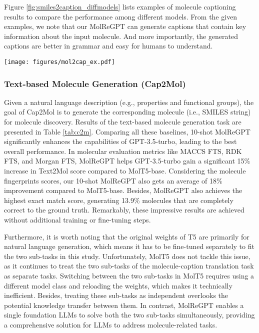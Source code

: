 \documentclass{article}
\theoremstyle{plain}
\theoremstyle{definition}
\theoremstyle{remark}
\begin{document}
Figure \ref{fig:smiles2caption_diffmodels} lists examples of molecule captioning results to compare the performance among different models. From the given examples, we note that our MolReGPT can generate captions that contain key information about the input molecule. And more importantly, the generated captions are better in grammar and easy for humans to understand.
\begin{figure*}[htb]
   \centering
   \texttt{[image: figures/mol2cap\_ex.pdf]} 
   \caption{Examples of molecule captions generated by different models, where SMILES strings are converted to molecule graphs for better visualization. 
   Based on the same input molecule graph, our MolReGPT can generate accurate and natural captions to describe the structure, properties, and even the functions of the molecule. 
   In contrast, Transformer generates meaningless captions that are far from the ground truth. Captions generated by MolT5-base seem better but still have many typo errors.}
   \label{fig:smiles2caption_diffmodels}
\end{figure*}





\subsubsection{Text-based Molecule Generation (Cap2Mol)}
Given a natural language description (e.g., properties and functional groups), the goal of Cap2Mol is to generate the corresponding molecule (i.e., SMILES string) for molecule discovery.
Results of the text-based molecule generation task are presented in Table \ref{tab:c2m}. 
Comparing all these baselines, 10-shot MolReGPT significantly enhances the capabilities of GPT-3.5-turbo, leading to the best overall performance.
In molecular evaluation metrics like MACCS FTS, RDK FTS, and Morgan FTS, MolReGPT helps GPT-3.5-turbo gain a significant 15\% increase in Text2Mol score compared to MolT5-base. 
Considering the molecule fingerprints scores, our 10-shot MolReGPT also gets an average of 18\% improvement compared to MolT5-base.
Besides, MolReGPT also achieves the highest exact match score, generating 13.9\% molecules that are completely correct to the ground truth. 
Remarkably, these impressive results are achieved without additional training or fine-tuning steps.

Furthermore, it is worth noting that the original weights of T5 are primarily for natural language generation, which means it has to be fine-tuned separately to fit the two sub-tasks in this study. 
Unfortunately, MolT5 does not tackle this issue, as it continues to treat the two sub-tasks of the molecule-caption translation task as separate tasks.
Switching between the two sub-tasks in MolT5 requires using a different model class and reloading the weights, which makes it technically inefficient. 
Besides, treating these sub-tasks as independent overlooks the potential knowledge transfer between them. In contrast, MolReGPT enables a single foundation LLMs to solve both the two sub-tasks simultaneously, providing a comprehensive solution for LLMs to address molecule-related tasks. 
\end{document}
